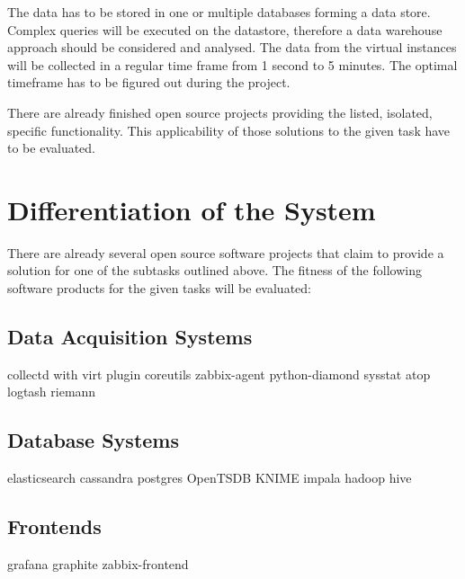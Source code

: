 The data has to be stored in one or multiple databases forming a data store.
Complex queries will be executed on the datastore, therefore a data warehouse
approach should be considered and analysed. The data from the virtual instances
will be collected in a regular time frame from 1 second to 5 minutes. The
optimal timeframe has to be figured out during the project.

There are already finished open source projects providing the listed, isolated,
specific functionality. This applicability of those solutions to the given task
have to be evaluated.

\section{Differentiation of the System}

There are already several open source software projects that claim to provide a
solution for one of the subtasks outlined above. The fitness of the following
software products for the given tasks will be evaluated:

\subsection{Data Acquisition Systems}

\begin{outline}
    \1 collectd with virt plugin
    \1 coreutils
    \1 zabbix-agent
    \1 python-diamond
    \1 sysstat
    \1 atop
    \1 logtash
    \1 riemann
\end{outline}

\subsection{Database Systems}

\begin{outline}
    \1 elasticsearch
    \1 cassandra
    \1 postgres
    \1 OpenTSDB
    \1 KNIME
    \1 impala
    \1 hadoop
    \1 hive
\end{outline}

\subsection{Frontends}

\begin{outline}
    \1 grafana
    \1 graphite
    \1 zabbix-frontend
\end{outline}

